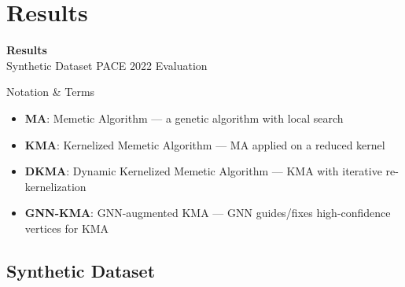 \documentclass[aspectratio=169,10pt]{beamer}
\begin{document}
\section{Results}
\begin{frame}[plain]
  \centering
  \vspace{1.0cm}
  {\Huge \textbf{Results}}\\[6pt]
  {\Large Synthetic Dataset \quad PACE 2022 \quad Evaluation}
\end{frame}

\begin{frame}{Notation \& Terms}
  \begin{itemize}
    \item \textbf{MA}: Memetic Algorithm — a genetic algorithm with local search
    \item \textbf{KMA}: Kernelized Memetic Algorithm — MA applied on a reduced kernel
    \item \textbf{DKMA}: Dynamic Kernelized Memetic Algorithm — KMA with iterative re-kernelization
    \item \textbf{GNN-KMA}: GNN-augmented KMA — GNN guides/fixes high-confidence vertices for KMA
  \end{itemize}
\end{frame}

\subsection{Synthetic Dataset}
\end{document}
